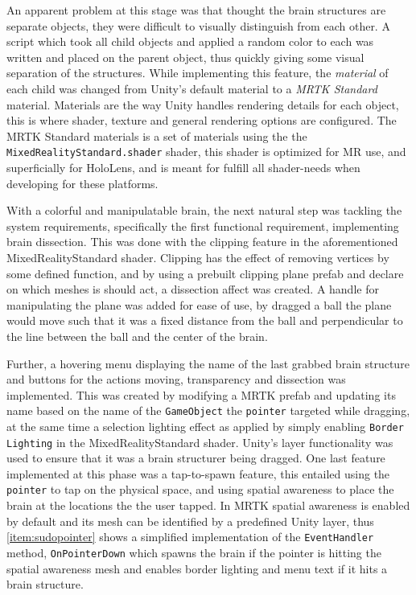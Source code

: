 An apparent problem at this stage was that thought the brain structures are separate objects, they were difficult to visually distinguish from each other. A script which took all child objects and applied a random color to each was written and placed on the parent object, thus quickly giving some visual separation of the structures. While implementing this feature, the \textit{material} of each child was changed from Unity's default material to a \textit{MRTK Standard} material. Materials are the way Unity handles rendering details for each object, this is where shader, texture and general rendering options are configured. The MRTK Standard materials is a set of materials using the the \texttt{MixedRealityStandard.shader} shader, this shader is optimized for MR use, and superficially for HoloLens, and is meant for fulfill all shader-needs when developing for these platforms. 

With a colorful and manipulatable brain, the next natural step was tackling the system requirements, specifically the first functional requirement, implementing brain dissection. This was done with the clipping feature in the aforementioned MixedRealityStandard shader. Clipping has the effect of removing vertices by some defined function, and by using a prebuilt clipping plane prefab and declare on which meshes is should act, a dissection affect was created. A handle for manipulating the plane was added for ease of use, by dragged a ball the plane would move such that it was a fixed distance from the ball and perpendicular to the line between the ball and the center of the brain.

Further, a hovering menu displaying the name of the last grabbed brain structure and buttons for the actions moving, transparency and dissection was implemented. This was created by modifying a MRTK prefab and updating its name based on the name of the \texttt{GameObject} the \texttt{pointer} targeted while dragging, at the same time a selection lighting effect as applied by simply enabling \texttt{Border Lighting} in the MixedRealityStandard shader. Unity's layer functionality was used to ensure that it was a brain structurer being dragged. One last feature implemented at this phase was a tap-to-spawn feature, this entailed using the \texttt{pointer} to tap on the physical space, and using spatial awareness to place the brain at the locations the the user tapped. In MRTK spatial awareness is enabled by default and its mesh can be identified by a predefined Unity layer, thus \autoref{item:sudopointer} shows a simplified implementation of the \texttt{EventHandler} method, \texttt{OnPointerDown} which spawns the brain if the pointer is hitting the spatial awareness mesh and enables border lighting and menu text if it hits a brain structure.


